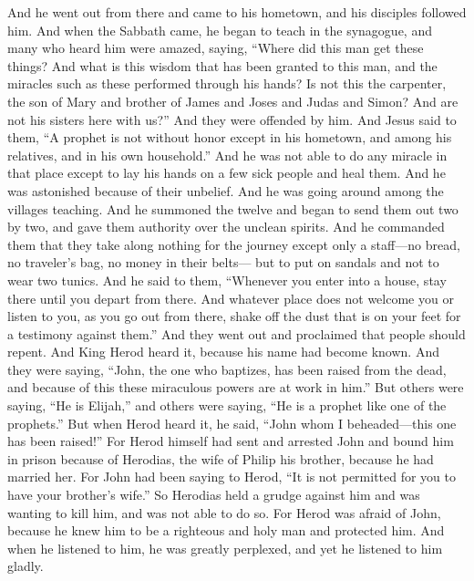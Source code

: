 \begin{biblechapter} %
 And he went out from there and came to his hometown, and his disciples followed him.
\verse And when the Sabbath came, he began to teach in the synagogue, and many who heard him were amazed, saying, “Where did this man get these things? And what is this wisdom that has been granted to this man, and the miracles such as these performed through his hands?
\verse Is not this the carpenter, the son of Mary and brother of James and Joses and Judas and Simon? And are not his sisters here with us?” And they were offended by him.
\verse And Jesus said to them, “A prophet is not without honor except in his hometown, and among his relatives, and in his own household.”
\verse And he was not able to do any miracle in that place except to lay his hands on a few sick people and heal them.
\verse And he was astonished because of their unbelief.
 And he was going around among the villages teaching.
\verse And he summoned the twelve and began to send them out two by two, and gave them authority over the unclean spirits.
\verse And he commanded them that they take along nothing for the journey except only a staff—no bread, no traveler’s bag, no money in their belts—
\verse but to put on sandals and not to wear two tunics.
\verse And he said to them, “Whenever you enter into a house, stay there until you depart from there.
\verse And whatever place does not welcome you or listen to you, as you go out from there, shake off the dust that is on your feet for a testimony against them.”
\verse And they went out and proclaimed that people should repent.
 And King Herod heard it, because his name had become known. And they were saying, “John, the one who baptizes, has been raised from the dead, and because of this these miraculous powers are at work in him.”
\verse But others were saying, “He is Elijah,” and others were saying, “He is a prophet like one of the prophets.”
\verse But when Herod heard it, he said, “John whom I beheaded—this one has been raised!”
\verse For Herod himself had sent and arrested John and bound him in prison because of Herodias, the wife of Philip his brother, because he had married her.
\verse For John had been saying to Herod, “It is not permitted for you to have your brother’s wife.”
\verse So Herodias held a grudge against him and was wanting to kill him, and was not able to do so.
\verse For Herod was afraid of John, because he knew him to be a righteous and holy man and protected him. And when he listened to him, he was greatly perplexed, and yet he listened to him gladly.

\end{biblechapter}

